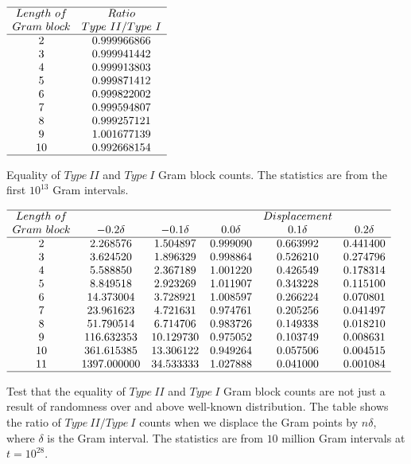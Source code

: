 \documentclass[twoside]{article}
\begin{document}
\begin{table}
\centering \(\begin{array}{cc}
\hline
Length~of 	& Ratio  \\
Gram~block	& Type~II/Type~I \\
\hline
2& 0.999966866\\
3& 0.999941442\\
4& 0.999913803\\
5& 0.999871412\\
6& 0.999822002\\
7& 0.999594807\\
8& 0.999257121\\
9& 1.001677139\\
10& 0.992668154\\
\hline
\end{array}\)
\caption{Equality of $Type~II$ and $Type~I$ Gram block counts. The statistics are from the first $10^{13}$ Gram intervals.} \label{tab:rosser}
\end{table}

\begin{table}
\centering \(\begin{array}{cccccc}
\hline
Length~of 	& &&&Displacement \\
Gram~block	& -0.2\delta & -0.1\delta & 0.0\delta & 0.1\delta & 0.2\delta  \\
\hline
2 &2.268576&1.504897&0.999090&0.663992&0.441400 \\
3 &3.624520&1.896329&0.998864&0.526210&0.274796 \\
4 &5.588850&2.367189&1.001220&0.426549&0.178314 \\
5 &8.849518&2.923269&1.011907&0.343228&0.115100 \\
6 &14.373004&3.728921&1.008597&0.266224&0.070801 \\
7 &23.961623&4.721631&0.974761&0.205256&0.041497 \\
8 &51.790514&6.714706&0.983726&0.149338&0.018210 \\
9 &116.632353&10.129730&0.975052&0.103749&0.008631 \\
10 &361.615385&13.306122&0.949264&0.057506&0.004515 \\
11 &1397.000000&34.533333&1.027888&0.041000&0.001084 \\
\hline
\end{array}\)
\caption{Test that the equality of $Type~II$ and $Type~I$ Gram block counts are not just a result of randomness over and above well-known distribution. The table shows the ratio of $Type~II/Type~I$ counts when we displace the Gram points by $n\delta$, where $\delta$ is the Gram interval. The statistics are from $10$ million Gram intervals at $t=10^{28}$.} \label{tab:rosserrandom}
\end{table}
\end{document}
